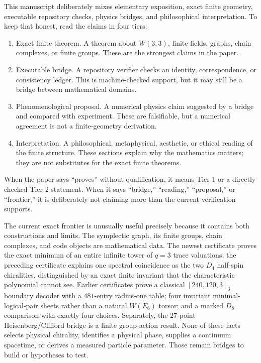 \documentclass[11pt]{article}
\def\textbf#1{#1}%
\begin{document}
This manuscript deliberately mixes elementary exposition, exact finite geometry, executable repository checks, physics bridges, and philosophical interpretation. To keep that honest, read the claims in four tiers:

\begin{statusbox}
\begin{enumerate}[label=\textbf{Tier \arabic*:},leftmargin=4.8em]
\item \textbf{Exact finite theorem.} A theorem about $W(3,3)$, finite fields, graphs, chain complexes, or finite groups. These are the strongest claims in the paper.
\item \textbf{Executable bridge.} A repository verifier checks an identity, correspondence, or consistency ledger. This is machine-checked support, but it may still be a bridge between mathematical domains.
\item \textbf{Phenomenological proposal.} A numerical physics claim suggested by a bridge and compared with experiment. These are falsifiable, but a numerical agreement is not a finite-geometry derivation.
\item \textbf{Interpretation.} A philosophical, metaphysical, aesthetic, or ethical reading of the finite structure. These sections explain why the mathematics matters; they are not substitutes for the exact finite theorems.
\end{enumerate}
\end{statusbox}

When the paper says ``proves'' without qualification, it means Tier 1 or a directly checked Tier 2 statement. When it says ``bridge,'' ``reading,'' ``proposal,'' or ``frontier,'' it is deliberately not claiming more than the current verification supports.

\begin{statusbox}[title=Read this first: the current map]
The current exact frontier is unusually useful precisely because it contains both constructions and limits.  The symplectic graph, its finite groups, chain complexes, and code objects are mathematical data.  The newest certificate proves the exact minimum of an entire infinite tower of $q=3$ trace valuations; the preceding certificate explains one spectral coincidence as the two $D_4$ half-spin chiralities, distinguished by an exact finite invariant that the characteristic polynomial cannot see.  Earlier certificates prove a classical $[240,120,3]_3$ boundary decoder with a $481$-entry radius-one table; four invariant minimal-logical-pair sheets rather than a natural $W(E_6)$ torsor; and a marked $D_8$ comparison with exactly four choices.  Separately, the $27$-point Heisenberg/Clifford bridge is a finite group-action result.  None of these facts selects physical chirality, identifies a physical phase, supplies a continuum spacetime, or derives a measured particle parameter.  Those remain bridges to build or hypotheses to test.
\end{statusbox}
\end{document}
